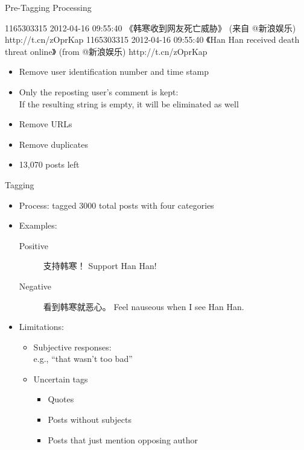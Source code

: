 \documentclass[12pt]{beamer}
\newcommand{\1}[1]{{\mathbf 1}\left\{#1\right\}}        %
\begin{document}
\begin{frame}[fragile]{Pre-Tagging Processing}

\begin{block}{}
1165303315 2012-04-16 09:55:40  《韩寒收到网友死亡威胁》 (来自 @新浪娱乐) http://t.cn/zOprKap
1165303315 2012-04-16 09:55:40  《Han Han received death threat online》 (from @新浪娱乐) http://t.cn/zOprKap
\end{block}


\begin{itemize}[<+->]
\item Remove user identification number and time stamp
\item Only the reposting user's comment is kept:\\
If the resulting string is empty, it will be eliminated as well
\item Remove URLs 
\item Remove duplicates 
\item 13,070 posts left
\end{itemize}


\end{frame}


\begin{frame}{Tagging}

\begin{itemize}[<+->]
\item  Process: tagged 3000 total posts with four categories
\item Examples:
	\begin{description}
	\item[Positive] 支持韩寒！ Support Han Han!
	\item[Negative] 看到韩寒就恶心。 Feel nauseous when I see Han Han.
	\end{description}


\item Limitations:
	
	\begin{itemize}
	\item Subjective responses:\\
		\quad e.g., ``that wasn't too bad''
	\item 	Uncertain tags
		\begin{itemize}
		\item Quotes
		\item Posts without subjects
		\item Posts that just mention opposing author
		\end{itemize}
	\end{itemize}

\end{itemize}

\end{frame}
\end{document}
